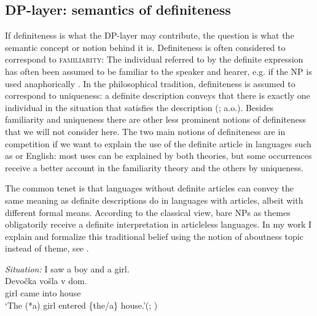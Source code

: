 \documentclass[output=paper]{langscibook}
\begin{document}
\subsection{DP-layer: semantics of definiteness}

If definiteness is what the DP-layer may contribute, the question is what the semantic concept or notion behind it is. Definiteness is often considered to correspond to \textsc{familiarity}:  The individual referred to by the definite expression has often been assumed to be familiar to the speaker and hearer, e.g. if the NP is used anaphorically \citep{Christophersen1939,Heim1982}. In the philosophical tradition, definiteness is assumed to correspond to uniqueness: a definite description conveys that there is exactly one individual in the situation that satisfies the description (\citealt{Chierchia1998,Dayal2004}; a.o.). Besides familiarity and uniqueness there are other less prominent notions of definiteness that we will not consider here. The two main notions of definiteness are in competition if we want to explain the use of the definite article in languages such as  or English: most uses can be explained by both theories, but some occurrences receive a better account in the familiarity theory and the others by uniqueness.

The common tenet is that languages without definite articles can convey the same meaning as definite descriptions do in languages with articles, albeit with different formal means. According to the classical view, bare NPs as themes obligatorily receive a definite interpretation in articleless  languages. In my work \cite{Geist2010} I explain and formalize this traditional belief using the notion of aboutness topic instead of theme, see .


\ea \label{ex:9} \textit{Situation:} I saw a boy and a girl.\\
\gll Devočka	 vošla   	v     dom. \\
    girl  came  	into house\\
\glt `The (*a) girl entered \{the/a\} house.'\hfill (; \citealt[193]{Geist2010})
\z
\end{document}
